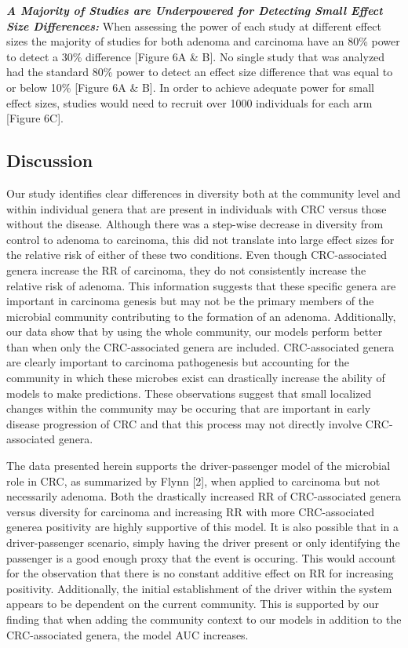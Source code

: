 \documentclass[12pt,]{article}
\begin{document}
\textbf{\emph{A Majority of Studies are Underpowered for Detecting Small
Effect Size Differences:}} When assessing the power of each study at
different effect sizes the majority of studies for both adenoma and
carcinoma have an 80\% power to detect a 30\% difference {[}Figure 6A \&
B{]}. No single study that was analyzed had the standard 80\% power to
detect an effect size difference that was equal to or below 10\%
{[}Figure 6A \& B{]}. In order to achieve adequate power for small
effect sizes, studies would need to recruit over 1000 individuals for
each arm {[}Figure 6C{]}.

\newpage

\subsection{Discussion}\label{discussion}

Our study identifies clear differences in diversity both at the
community level and within individual genera that are present in
individuals with CRC versus those without the disease. Although there
was a step-wise decrease in diversity from control to adenoma to
carcinoma, this did not translate into large effect sizes for the
relative risk of either of these two conditions. Even though
CRC-associated genera increase the RR of carcinoma, they do not
consistently increase the relative risk of adenoma. This information
suggests that these specific genera are important in carcinoma genesis
but may not be the primary members of the microbial community
contributing to the formation of an adenoma. Additionally, our data show
that by using the whole community, our models perform better than when
only the CRC-associated genera are included. CRC-associated genera are
clearly important to carcinoma pathogenesis but accounting for the
community in which these microbes exist can drastically increase the
ability of models to make predictions. These observations suggest that
small localized changes within the community may be occuring that are
important in early disease progression of CRC and that this process may
not directly involve CRC-associated genera.

The data presented herein supports the driver-passenger model of the
microbial role in CRC, as summarized by Flynn {[}2{]}, when applied to
carcinoma but not necessarily adenoma. Both the drastically increased RR
of CRC-associated genera versus diversity for carcinoma and increasing
RR with more CRC-associated generea positivity are highly supportive of
this model. It is also possible that in a driver-passenger scenario,
simply having the driver present or only identifying the passenger is a
good enough proxy that the event is occuring. This would account for the
observation that there is no constant additive effect on RR for
increasing positivity. Additionally, the initial establishment of the
driver within the system appears to be dependent on the current
community. This is supported by our finding that when adding the
community context to our models in addition to the CRC-associated
genera, the model AUC increases.
\end{document}
